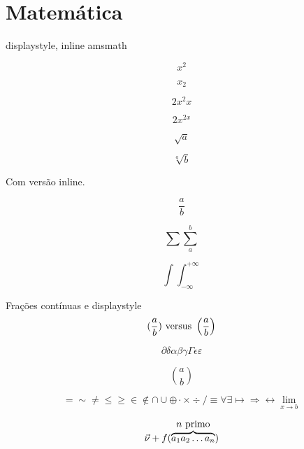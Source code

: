 \section{Matemática}\label{sec:matematica}

displaystyle, inline
amsmath


$$x^2$$

$$x_2$$

$$2x^2x$$

$$2x^{2x}$$

$$\sqrt{a}$$

$$\sqrt[a]b$$

Com versão inline.

$$\frac ab$$

$$\sum \sum_a^b$$

$$\int\!\!\!\int_{-\infty}^{+\infty}$$

Frações contínuas e displaystyle
$$(\frac ab) \hbox{ versus } \left(\frac ab\right)$$

$$\partial\delta\alpha\beta\gamma\Gamma\epsilon\varepsilon$$

$$a \choose b$$

$$=\sim\neq\leq\geq\in\notin\cap\cup\oplus\cdot\times\div/\equiv\forall\exists\mapsto\Rightarrow\longleftrightarrow
\lim_{x\to b}$$


$$\vec{\nu}+f(\overbrace{a_1a_2\ldots a_n}^{\hbox{$n$ primo}})$$
